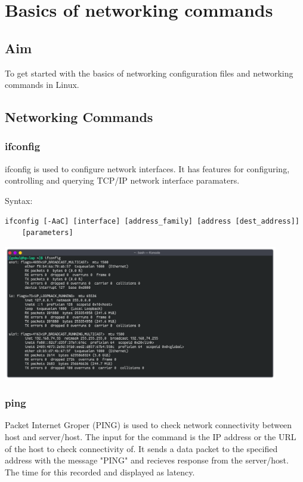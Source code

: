 \section{Basics of networking commands}
\subsection{Aim}
To get started with the basics of networking configuration files and networking
commands in Linux.
\subsection{Networking Commands}
\subsubsection{ifconfig}
ifconfig is used to configure network interfaces. It has features 
for configuring, controlling and querying TCP/IP network interface paramaters.
\linebreak[2]


Syntax:
\begin{lstlisting}
ifconfig [-AaC] [interface] [address_family] [address [dest_address]] 
	[parameters]
\end{lstlisting}

\begin{center}
	\includegraphics[width=0.90\textwidth]{img/p1/ss1.png}
\end{center}


\subsubsection{ping}
Packet Internet Groper (PING) is used to check network connectivity 
between host and server/host. The input for the command is the IP 
address or the URL of the host to check connectivity of. 
It sends a data packet to the specified address with the message "PING"
and recieves response from the server/host. The time for this
recorded and displayed as latency. 

